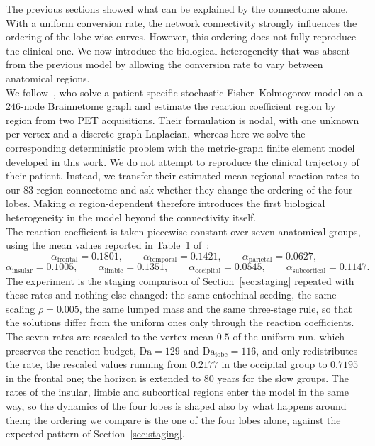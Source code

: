 The previous sections showed what can be explained by the connectome alone. With a uniform conversion rate, the network connectivity strongly influences the ordering of the lobe-wise curves. However, this ordering does not fully reproduce the clinical one. We now introduce the biological heterogeneity that was absent from the previous model by allowing the conversion rate to vary between anatomical regions.\\
We follow~\cite{cortiFisherKolmogorovGraphs}, who solve a patient-specific stochastic Fisher--Kolmogorov model on a $246$-node Brainnetome graph and estimate the reaction coefficient region by region from two PET acquisitions. Their formulation is nodal, with one unknown per vertex and a discrete graph Laplacian, whereas here we solve the corresponding deterministic problem with the metric-graph finite element model developed in this work. We do not attempt to reproduce the clinical trajectory of their patient. Instead, we transfer their estimated mean regional reaction rates to our $83$-region connectome and ask whether they change the ordering of the four lobes. Making $\alpha$ region-dependent therefore introduces the first biological heterogeneity in the model beyond the connectivity itself.\\
The reaction coefficient is taken piecewise constant over seven anatomical groups, using the mean values reported in Table~1 of~\cite{cortiFisherKolmogorovGraphs}:
\[
\alpha_{\mathrm{frontal}}=0.1801,\qquad
\alpha_{\mathrm{temporal}}=0.1421,\qquad
\alpha_{\mathrm{parietal}}=0.0627,
\]
\[
\alpha_{\mathrm{insular}}=0.1005,\qquad
\alpha_{\mathrm{limbic}}=0.1351,\qquad
\alpha_{\mathrm{occipital}}=0.0545,\qquad
\alpha_{\mathrm{subcortical}}=0.1147.
\]
The experiment is the staging comparison of Section~\ref{sec:staging} repeated with these rates and nothing else changed: the same entorhinal seeding, the same scaling $\rho=0.005$, the same lumped mass and the same three-stage rule, so that the solutions differ from the uniform ones only through the reaction coefficients. The seven rates are rescaled to the vertex mean $0.5$ of the uniform run, which preserves the reaction budget, $\mathrm{Da}=129$ and $\mathrm{Da}_{\mathrm{lobe}}=116$, and only redistributes the rate, the rescaled values running from $0.2177$ in the occipital group to $0.7195$ in the frontal one; the horizon is extended to $80$ years for the slow groups. The rates of the insular, limbic and subcortical regions enter the model in the same way, so the dynamics of the four lobes is shaped also by what happens around them; the ordering we compare is the one of the four lobes alone, against the expected pattern of Section~\ref{sec:staging}.\\
